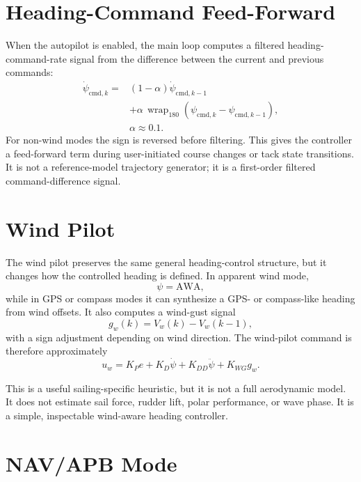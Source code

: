 \documentclass[10pt,twocolumn]{article}
\newcommand{\wrap}{\operatorname{wrap}_{180}}
\newcommand{\heading}{\psi}
\newcommand{\cmd}{\mathrm{cmd}}
\newcommand{\AWA}{\mathrm{AWA}}
\begin{document}
\section{Heading-Command Feed-Forward}

When the autopilot is enabled, the main loop computes a filtered heading-command-rate
signal from the difference between the current and previous commands:
\begin{equation}
\begin{split}
  \dot{\heading}_{\cmd,k} ={}&
  (1-\alpha)\dot{\heading}_{\cmd,k-1} \\
  &+ \alpha\,\wrap(\heading_{\cmd,k}-\heading_{\cmd,k-1}), \\
  &\alpha \approx 0.1.
\end{split}
\end{equation}
For non-wind modes the sign is reversed before filtering.  This gives the controller a
feed-forward term during user-initiated course changes or tack state transitions.  It is
not a reference-model trajectory generator; it is a first-order filtered command-difference
signal.

\section{Wind Pilot}

The wind pilot preserves the same general heading-control structure, but it changes how
the controlled heading is defined.  In apparent wind mode,
\begin{equation}
  \heading = \AWA,
\end{equation}
while in GPS or compass modes it can synthesize a GPS- or compass-like heading from wind
offsets.  It also computes a wind-gust signal
\begin{equation}
  g_w(k) = V_w(k)-V_w(k-1),
\end{equation}
with a sign adjustment depending on wind direction.  The wind-pilot command is therefore
approximately
\begin{equation}
  u_w = K_P e + K_D\dot{\heading} + K_{DD}\ddot{\heading} + K_{WG}g_w.
  \label{eq:wind}
\end{equation}

This is a useful sailing-specific heuristic, but it is not a full aerodynamic model.  It
does not estimate sail force, rudder lift, polar performance, or wave phase.  It is a
simple, inspectable wind-aware heading controller.

\section{NAV/APB Mode}
\end{document}
